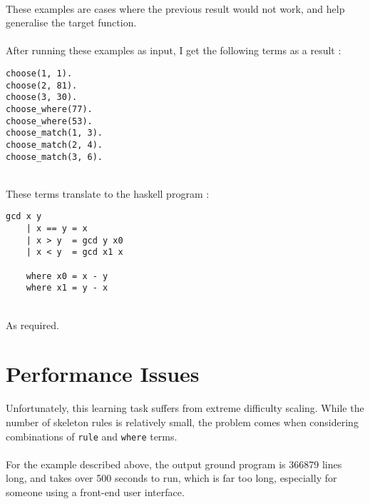 
\mbox{}\\
These examples are cases where the previous result would not work, and help generalise the target function. \\ \\
After running these examples as input, I get the following terms as a result : \\

\begin{lstlisting}
choose(1, 1).
choose(2, 81).
choose(3, 30).
choose_where(77).
choose_where(53).
choose_match(1, 3).
choose_match(2, 4).
choose_match(3, 6).
\end{lstlisting}
\mbox{} \\
These terms translate to the haskell program :

\begin{lstlisting}
gcd x y
	| x == y = x
	| x > y  = gcd y x0
	| x < y  = gcd x1 x
	
	where x0 = x - y
	where x1 = y - x
\end{lstlisting}
\mbox{}\\
As required.

\section{Performance Issues}
Unfortunately, this learning task suffers from extreme difficulty scaling. While the number of skeleton rules is relatively small, the problem comes when considering combinations of \lstinline{rule} and \lstinline{where} terms.\\ \\ %
For the example described above, the output ground program is 366879 lines long, and takes over 500 seconds to run, which is far too long, especially for someone using a front-end user interface.

